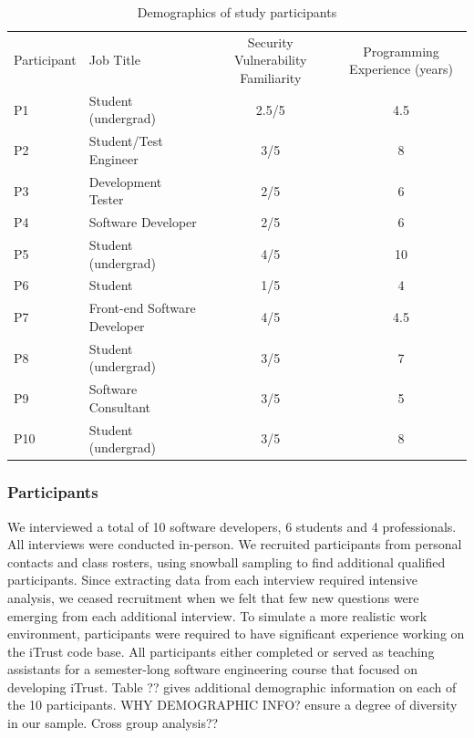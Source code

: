 \documentclass[conference]{IEEEtran}
\begin{document}
\begin{table} 
\centering
\caption{Demographics of study participants}
\begin{tabular}{|l|l|c|c|}
\rowcolor{gray!50}
\hline
    Participant			& Job Title 						& Security Vulnerability Familiarity 					& Programming Experience (years) \\
    
    P1			    	& Student (undergrad)     			& 2.5/5												 	&  4.5    \\
    \hline
    P2			    	& Student/Test Engineer    			& 3/5									    			&  8 		\\
    \hline
    P3 					& Development Tester       			& 2/5													&  6 	    	\\
    \hline
    P4					& Software Developer     			& 2/5				 									&  6     	\\
    \hline
    P5					& Student (undergrad)      			& 4/5													&  10 	\\
    \hline
    P6					& Student		    				& 1/5							    					& 4		\\
    \hline
    P7					& Front-end Software Developer    	& 4/5													& 4.5              \\
    \hline
    P8					& Student (undergrad)	    		& 3/5													& 7   \\
    \hline
    P9					& Software Consultant   	 		& 3/5													& 5	  		 \\
    \hline
    P10			    	& Student (undergrad)    			& 3/5										 			& 8	              \\
    \hline
\end{tabular}
\label{table:participants}
\end{table}



\subsubsection{Participants}

We interviewed a total of 10 software developers, 6 students and 4 professionals. 
All interviews were conducted in-person.
We recruited participants from personal contacts and class rosters, using snowball sampling to find additional qualified participants.
Since extracting data from each interview required intensive analysis, we ceased recruitment when we felt that few new questions were emerging from each additional interview.
To simulate a more realistic work environment, participants were required to have significant experience working on the iTrust code base. All participants either completed or served as teaching assistants for a semester-long software engineering course that focused on developing iTrust.
Table ?? gives additional demographic information on each of the 10 participants. 
WHY DEMOGRAPHIC INFO? ensure a degree of diversity in our sample. Cross group analysis??
\end{document}
